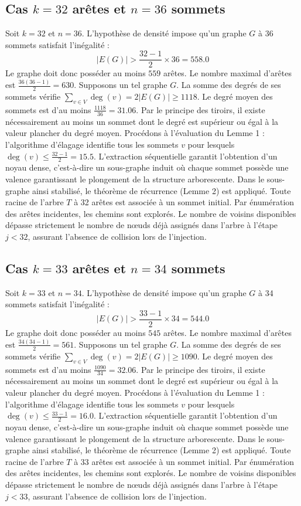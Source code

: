 \documentclass[12pt,a4paper]{article}
\begin{document}
\subsection{Cas $k = 32$ arêtes et $n = 36$ sommets}
Soit $k = 32$ et $n = 36$. L'hypothèse de densité impose qu'un graphe $G$ à 36 sommets satisfait l'inégalité :
$$ |E(G)| > \frac{32-1}{2} \times 36 = 558.0 $$
Le graphe doit donc posséder au moins $559$ arêtes. Le nombre maximal d'arêtes est $\frac{36(36-1)}{2} = 630$.
Supposons un tel graphe $G$. La somme des degrés de ses sommets vérifie $\sum_{v \in V} \deg(v) = 2|E(G)| \geq 1118$.
Le degré moyen des sommets est d'au moins $\frac{1118}{36} = 31.06$.
Par le principe des tiroirs, il existe nécessairement au moins un sommet dont le degré est supérieur ou égal à la valeur plancher du degré moyen.
Procédons à l'évaluation du Lemme 1 : l'algorithme d'élagage identifie tous les sommets $v$ pour lesquels $\deg(v) \leq \frac{32-1}{2} = 15.5$.
L'extraction séquentielle garantit l'obtention d'un noyau dense, c'est-à-dire un sous-graphe induit où chaque sommet possède une valence garantissant le plongement de la structure arborescente.
Dans le sous-graphe ainsi stabilisé, le théorème de récurrence (Lemme 2) est appliqué. Toute racine de l'arbre $T$ à 32 arêtes est associée à un sommet initial. Par énumération des arêtes incidentes, les chemins sont explorés. Le nombre de voisins disponibles dépasse strictement le nombre de nœuds déjà assignés dans l'arbre à l'étape $j < 32$, assurant l'absence de collision lors de l'injection.

\subsection{Cas $k = 33$ arêtes et $n = 34$ sommets}
Soit $k = 33$ et $n = 34$. L'hypothèse de densité impose qu'un graphe $G$ à 34 sommets satisfait l'inégalité :
$$ |E(G)| > \frac{33-1}{2} \times 34 = 544.0 $$
Le graphe doit donc posséder au moins $545$ arêtes. Le nombre maximal d'arêtes est $\frac{34(34-1)}{2} = 561$.
Supposons un tel graphe $G$. La somme des degrés de ses sommets vérifie $\sum_{v \in V} \deg(v) = 2|E(G)| \geq 1090$.
Le degré moyen des sommets est d'au moins $\frac{1090}{34} = 32.06$.
Par le principe des tiroirs, il existe nécessairement au moins un sommet dont le degré est supérieur ou égal à la valeur plancher du degré moyen.
Procédons à l'évaluation du Lemme 1 : l'algorithme d'élagage identifie tous les sommets $v$ pour lesquels $\deg(v) \leq \frac{33-1}{2} = 16.0$.
L'extraction séquentielle garantit l'obtention d'un noyau dense, c'est-à-dire un sous-graphe induit où chaque sommet possède une valence garantissant le plongement de la structure arborescente.
Dans le sous-graphe ainsi stabilisé, le théorème de récurrence (Lemme 2) est appliqué. Toute racine de l'arbre $T$ à 33 arêtes est associée à un sommet initial. Par énumération des arêtes incidentes, les chemins sont explorés. Le nombre de voisins disponibles dépasse strictement le nombre de nœuds déjà assignés dans l'arbre à l'étape $j < 33$, assurant l'absence de collision lors de l'injection.
\end{document}
